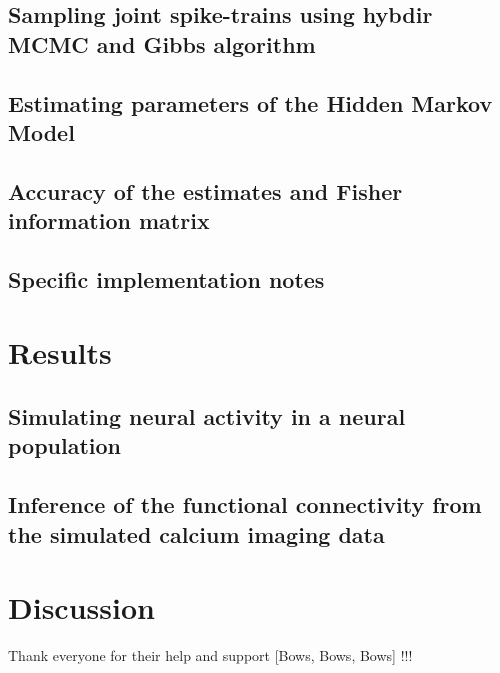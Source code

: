 \documentclass[amsmath, amssymb]{revtex4}
\begin{document}
\subsection{Sampling joint spike-trains using hybdir MCMC and Gibbs algorithm}
\label{sec:methods:sampling HMM}


\subsection{Estimating parameters of the Hidden Markov Model}
\label{sec:methods:parameters HMM}


\subsection{Accuracy of the estimates and Fisher information matrix}
\label{sec:methods:accuracy_Fisher}


\subsection{Specific implementation notes}
\label{sec:methods:specific_implementation}


\section{Results}
\label{results}

\subsection{Simulating neural activity in a neural population}
\label{sec:results:simulations}


\subsection{Inference of the functional connectivity from the simulated calcium imaging data}
\label{sec:results:inference}


\section{Discussion}
\label{discussion}


\begin{acknowledgments}
Thank everyone for their help and support [Bows, Bows, Bows] !!!
\end{acknowledgments}



\end{document}
